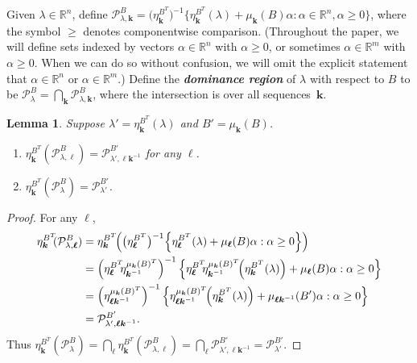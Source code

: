 \documentclass[10pt]{article}
\newtheorem{lemma}[proposition]{Lemma}
\theoremstyle{definition}
\theoremstyle{remark}
\numberwithin{equation}{section}
\newcommand{\newword}[1]{\textbf{\emph{#1}}}
\newcommand{\reals}{\mathbb R}
\newcommand{\set}[1]{{\lbrace #1 \rbrace}}
\newcommand{\sett}[1]{{\bigl\lbrace #1 \bigr\rbrace}}
\newcommand{\settt}[1]{{\Bigl\lbrace #1 \Bigr\rbrace}}
\newcommand{\0}{{\mathbf{0}}}
\newcommand{\kk}{{\boldsymbol{k}}}
\renewcommand{\ll}{{\boldsymbol\ell}}
\renewcommand{\P}{\mathcal{P}}
\begin{document}
Given $\lambda\in\reals^n$, define $\P^B_{\lambda,\kk}=\bigl(\eta_{\kk}^{B^T}\bigr)^{-1}\sett{\eta_\kk^{B^T}(\lambda)+\mu_\kk(B)\alpha:\alpha\in\reals^n,\alpha\ge0}$, where the symbol $\ge$ denotes componentwise comparison.
(Throughout the paper, we will define sets indexed by vectors $\alpha\in\reals^n$ with $\alpha\ge0$, or sometimes $\alpha\in\reals^m$ with $\alpha\ge0$.
When we can do so without confusion, we will omit the explicit statement that $\alpha\in\reals^n$ or $\alpha\in\reals^m$.)
Define the \newword{dominance region} of $\lambda$ with respect to $B$ to be $\P^B_\lambda=\bigcap_\kk\P^B_{\lambda,\kk}$, where the intersection is over all sequences~$\kk$.
\begin{lemma}\label{shift}
Suppose $\lambda'=\eta^{B^T}_\kk(\lambda)$ and $B'=\mu_\kk(B)$.
\begin{enumerate}[label=\bf\arabic*., ref=\arabic*]
\item \label{shift one}
$\eta^{B^T}_\kk\!\!(\P^B_{\lambda,\ll})=\P^{B'}_{\lambda',\ll\kk^{-1}}$ for any $\ll$.
\item \label{shift all}
$\eta^{B^T}_\kk\!\!(\P^B_\lambda)=\P^{B'}_{\lambda'}$.
\end{enumerate}
\end{lemma}
\begin{proof}
For any $\ll$,
\begin{align*}
\eta^{B^T}_\kk\!\!(\P^B_{\lambda,\ll})
&=\eta^{B^T}_\kk\!\!\left(\bigl(\eta_{\ll}^{B^T}\bigr)^{-1}\settt{\eta_\ll^{B^T}(\lambda)+\mu_\ll(B)\alpha:\alpha\ge0}\right)\\
&=\left(\eta^{B^T}_\ll\!\!\eta_{\kk^{-1}}^{\mu_\kk(B)^T}\right)^{-1}\settt{\eta_\ll^{B^T}\!\!\eta_{\kk^{-1}}^{\mu_\kk(B)^T}\!\!\left(\eta^{B^T}_\kk(\lambda)\right)+\mu_\ll(B)\alpha:\alpha\ge0}\\
&=\left(\eta^{\mu_\kk(B)^T}_{\ll\kk^{-1}}\right)^{-1}\settt{\eta^{\mu_\kk(B)^T}_{\ll\kk^{-1}}\!\!\left(\eta^{B^T}_\kk(\lambda)\right)+\mu_{\ll\kk^{-1}}(B')\alpha:\alpha\ge0}\\
&=\P^{B'}_{\lambda',\ll\kk^{-1}}.
\end{align*}
  Thus $\eta^{B^T}_\kk\!\!(\P^B_\lambda)=\bigcap_\ll\eta^{B^T}_\kk\!\!(\P^B_{\lambda,\ll})=\bigcap_\ll\P^{B'}_{\lambda',\ll\kk^{-1}}=\P^{B'}_{\lambda'}$.
\end{proof}
\end{document}

